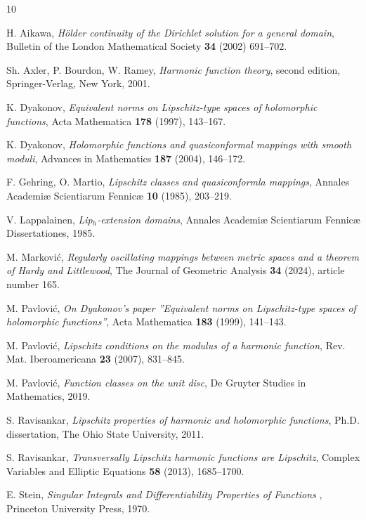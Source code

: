 \documentclass[10pt]{amsart}
\theoremstyle{definition}
\numberwithin{equation}{section}
\begin{document}
\begin{thebibliography}{10}

H. Aikawa, \textit{H\"{o}lder continuity of the Dirichlet solution for a general     domain},     Bulletin of the London
Mathematical Society \textbf{34} (2002) 691--702.

Sh. Axler, P. Bourdon, W. Ramey,     \textit{Harmonic function theory}, second edition, Springer-Verlag, New York, 2001.

K. Dyakonov,            \textit{Equivalent norms on Lipschitz-type spaces of holomorphic functions},    Acta Mathematica
\textbf{178} (1997), 143--167.

K. Dyakonov, \textit{Holomorphic functions and quasiconformal mappings with smooth moduli},     Advances in  Mathematics
\textbf{187} (2004), 146--172.

F. Gehring,  O. Martio, \textit{Lipschitz classes and quasiconformla mappings},  Annales        Academi{\ae} Scientiarum
Fennic{\ae} \textbf{10} (1985), 203--219.

V. Lappalainen, \textit{Lip$_h$-extension domains},  Annales  Academi{\ae} Scientiarum Fennic{\ae} Dissertationes, 1985.

M. Markovi\'{c}, \textit{Regularly oscillating mappings  between  metric  spaces and a theorem of Hardy and Littlewood},
The Journal of Geometric Analysis \textbf{34} (2024), article number 165.

M. Pavlovi\'{c}, \textit{On Dyakonov's paper ''Equivalent norms on  Lipschitz-type  spaces of  holomorphic functions''},
Acta Mathematica  \textbf{183} (1999), 141--143.

M. Pavlovi\'{c},  \textit{Lipschitz conditions on the modulus of a harmonic function}, Rev.      Mat.     Iberoamericana
\textbf{23}  (2007), 831--845.

M. Pavlovi\'{c}, \textit{Function classes on the unit disc}, De Gruyter Studies in Mathematics, 2019.

S. Ravisankar, \textit{Lipschitz properties of harmonic and holomorphic functions}, Ph.D. dissertation,  The Ohio  State
University,  2011.

S. Ravisankar, \textit{Transversally     Lipschitz harmonic functions are Lipschitz},    Complex Variables and  Elliptic
Equations \textbf{58} (2013), 1685--1700.

E.  Stein, \textit{Singular Integrals and Differentiability Properties of Functions }, Princeton University Press, 1970.

\end{thebibliography}
\end{document}
